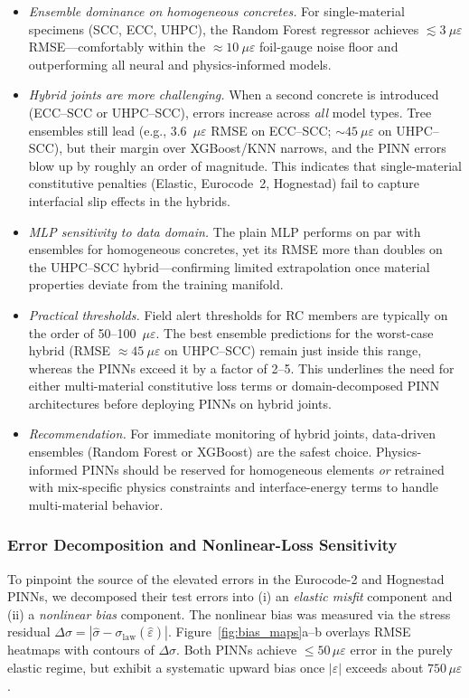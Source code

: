 \documentclass{article}
\begin{document}
\begin{itemize}
 \item \emph{Ensemble dominance on homogeneous concretes.} For single-material specimens (SCC, ECC, UHPC), the Random Forest regressor achieves $\lesssim 3~\mu\varepsilon$ RMSE—comfortably within the $\approx 10~\mu\varepsilon$ foil-gauge noise floor and outperforming all neural and physics-informed models.
  \item \emph{Hybrid joints are more challenging.} When a second concrete is introduced (ECC–SCC or UHPC–SCC), errors increase across \emph{all} model types. Tree ensembles still lead (e.g., 3.6~$\mu\varepsilon$ RMSE on ECC–SCC; $\sim\!45~\mu\varepsilon$ on UHPC–SCC), but their margin over XGBoost/KNN narrows, and the PINN errors blow up by roughly an order of magnitude. This indicates that single-material constitutive penalties (Elastic, Eurocode~2, Hognestad) fail to capture interfacial slip effects in the hybrids.
  \item \emph{MLP sensitivity to data domain.} The plain MLP performs on par with ensembles for homogeneous concretes, yet its RMSE more than doubles on the UHPC–SCC hybrid—confirming limited extrapolation once material properties deviate from the training manifold.
  \item \emph{Practical thresholds.} Field alert thresholds for RC members are typically on the order of 50–100~$\mu\varepsilon$. The best ensemble predictions for the worst-case hybrid (RMSE $\approx 45~\mu\varepsilon$ on UHPC–SCC) remain just inside this range, whereas the PINNs exceed it by a factor of 2–5. This underlines the need for either multi-material constitutive loss terms or domain-decomposed PINN architectures before deploying PINNs on hybrid joints.
  \item \emph{Recommendation.} For immediate monitoring of hybrid joints, data-driven ensembles (Random Forest or XGBoost) are the safest choice. Physics-informed PINNs should be reserved for homogeneous elements \emph{or} retrained with mix-specific physics constraints and interface-energy terms to handle multi-material behavior.
\end{itemize}

\subsubsection{Error Decomposition and Nonlinear-Loss Sensitivity}
\label{sec:error_decomp}

To pinpoint the source of the elevated errors in the Eurocode-2 and Hognestad PINNs, we decomposed their test errors into (i) an \emph{elastic misfit} component and (ii) a \emph{nonlinear bias} component. The nonlinear bias was measured via the stress residual $\Delta\sigma = |\hat{\sigma} - \sigma_{\text{law}}(\hat{\varepsilon})|$. Figure~\ref{fig:bias_maps}a–b overlays RMSE heatmaps with contours of $\Delta\sigma$. Both PINNs achieve $\leq 50\,\mu\varepsilon$ error in the purely elastic regime, but exhibit a systematic upward bias once $|\varepsilon|$ exceeds about $750\,\mu\varepsilon$.
\end{document}

